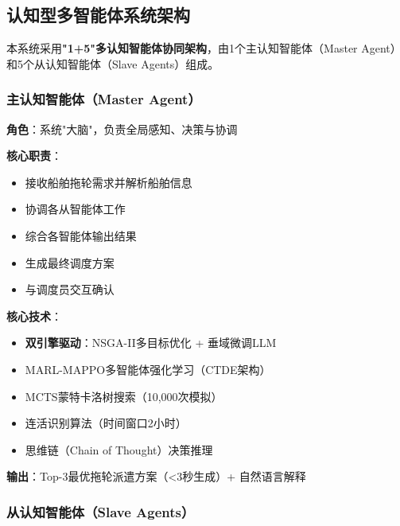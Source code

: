 \documentclass[12pt,a4paper]{article}
\begin{document}
\subsection{认知型多智能体系统架构}

本系统采用\textbf{"1+5"多认知智能体协同架构}，由1个主认知智能体（Master Agent）和5个从认知智能体（Slave Agents）组成。

\subsubsection{主认知智能体（Master Agent）}

\begin{tcolorbox}[colback=cyan!5!white,colframe=cyan!75!black,title=\textbf{Master Agent：调度决策与优化中枢}]
\textbf{角色}：系统"大脑"，负责全局感知、决策与协调

\textbf{核心职责}：
\begin{itemize}
    \item 接收船舶拖轮需求并解析船舶信息
    \item 协调各从智能体工作
    \item 综合各智能体输出结果
    \item 生成最终调度方案
    \item 与调度员交互确认
\end{itemize}

\textbf{核心技术}：
\begin{itemize}
    \item \textbf{双引擎驱动}：NSGA-II多目标优化 + 垂域微调LLM
    \item MARL-MAPPO多智能体强化学习（CTDE架构）
    \item MCTS蒙特卡洛树搜索（10,000次模拟）
    \item 连活识别算法（时间窗口2小时）
    \item 思维链（Chain of Thought）决策推理
\end{itemize}

\textbf{输出}：Top-3最优拖轮派遣方案（<3秒生成）+ 自然语言解释
\end{tcolorbox}

\subsubsection{从认知智能体（Slave Agents）}

\vspace{0.5cm}
\end{document}
